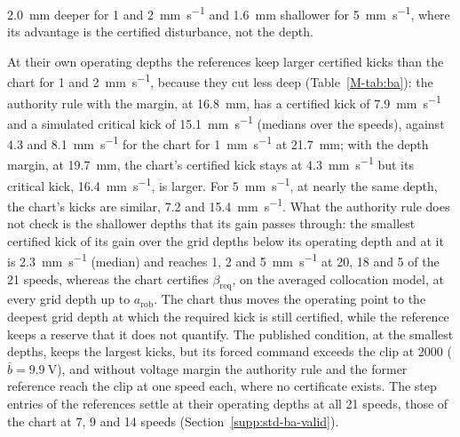 \SI{2.0}{\milli\metre} deeper for 1 and \SI{2}{\milli\metre\per\second} and \SI{1.6}{\milli\metre} shallower for \SI{5}{\milli\metre\per\second}, where its advantage is the certified disturbance, not the depth.

At their own operating depths the references keep larger certified kicks than the chart for 1 and \SI{2}{\milli\metre\per\second}, because they cut less deep (Table~\ref{M-tab:ba}): the authority rule with the margin, at \SI{16.8}{\milli\metre}, has a certified kick of \SI{7.9}{\milli\metre\per\second} and a simulated critical kick of \SI{15.1}{\milli\metre\per\second} (medians over the speeds), against 4.3 and \SI{8.1}{\milli\metre\per\second} for the chart for \SI{1}{\milli\metre\per\second} at \SI{21.7}{\milli\metre}; with the depth margin, at \SI{19.7}{\milli\metre}, the chart's certified kick stays at \SI{4.3}{\milli\metre\per\second} but its critical kick, \SI{16.4}{\milli\metre\per\second}, is larger. For \SI{5}{\milli\metre\per\second}, at nearly the same depth, the chart's kicks are similar, 7.2 and \SI{15.4}{\milli\metre\per\second}. What the authority rule does not check is the shallower depths that its gain passes through: the smallest certified kick of its gain over the grid depths below its operating depth and at it is \SI{2.3}{\milli\metre\per\second} (median) and reaches 1, 2 and \SI{5}{\milli\metre\per\second} at 20, 18 and 5 of the 21 speeds, whereas the chart certifies $\beta_{\mathrm{req}}$, on the averaged collocation model, at every grid depth up to $a_{\mathrm{rob}}$. The chart thus moves the operating point to the deepest grid depth at which the required kick is still certified, while the reference keeps a reserve that it does not quantify. The published condition, at the smallest depths, keeps the largest kicks, but its forced command exceeds the clip at \SI{2000}{\rpm} ($\bar b=\SI{9.9}{\volt}$), and without voltage margin the authority rule and the former reference reach the clip at one speed each, where no certificate exists. The step entries of the references settle at their operating depths at all 21 speeds, those of the chart at 7, 9 and 14 speeds (Section~\ref{supp:std-ba-valid}).
